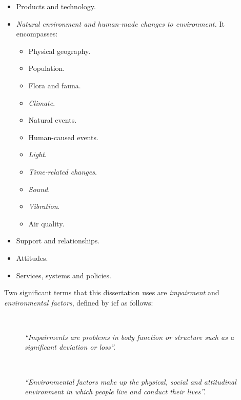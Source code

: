 \begin{itemize}
  \item Products and technology.
  \item \textit{Natural environment and human-made changes to environment.} It 
  encompasses:
  \begin{multicols}{2}
    \begin{itemize}
      \item Physical geography.
      \item Population.
      \item Flora and fauna.
      \item \textit{Climate}.
      \item Natural events.
      \item Human-caused events.
      \item \textit{Light}.
      \item \textit{Time-related changes}.
      \item \textit{Sound}.
      \item \textit{Vibration}.
      \item Air quality.
    \end{itemize}
  \end{multicols}

  \item Support and relationships.
  \item Attitudes.
  \item Services, systems and policies.
\end{itemize}

Two significant terms that this dissertation uses are \textit{impairment} and 
\textit{environmental factors}, defined by \ac{icf} as follows:

\begin{description}
  \item[] \hfill \\
    \begin{mdframed}[hidealllines=true,backgroundcolor=gray!20]
    \textit{``Impairments are problems in body function or structure such as a 
    significant deviation or loss''.}
    \end{mdframed} 
    
  \item[] \hfill \\
    \begin{mdframed}[hidealllines=true,backgroundcolor=gray!20]
    \textit{``Environmental factors make up the physical, social and attitudinal
    environment in which people live and conduct their lives''.}
    \end{mdframed} 
\end{description}

